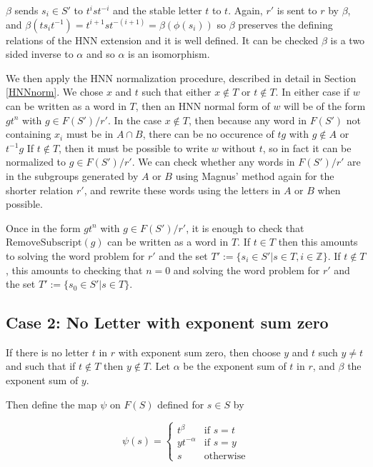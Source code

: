 \documentclass[11pt]{article} %
\theoremstyle{definition}
\theoremstyle{definition}
\theoremstyle{definition}
\theoremstyle{definition}
\theoremstyle{definition}
\theoremstyle{definition}
\begin{document}
$\beta$ sends $s_i \in S'$ to $t^{i} s t^{-i}$ and the stable letter $t$ to $t$.
Again, $r'$ is sent to $r$ by $\beta$, and $\beta (t s_i t^{-1}) = t^{i+1} s t^{-(i+1)} =
\beta (\phi (s_i))$ so $\beta$ preserves the defining relations of the HNN extension and it
is well defined. It can be checked $\beta$ is a two sided inverse to $\alpha$ and so $\alpha$
is an isomorphism.

We then apply the HNN normalization procedure, described in detail in Section \ref{HNNnorm}.
We chose $x$ and $t$ such that either $x \notin T$ or $t \notin T$. In either case if $w$
can be written as a word in $T$, then an HNN normal form of $w$ will be of the form $g t^n$
with $g \in F(S') / r'$. In the case $x \notin T$, then because any word in
$F(S')$ not containing $x_i$ must be in $A \cap B$, there can be no occurence of
$tg$ with $g \notin A$ or $t^{-1}g$
If $t \notin T$, then it must be possible to write $w$ without $t$, so in fact it can be normalized
to $g \in F(S') / r'$. We can check whether any words in $F(S') / r'$ are in the subgroups
generated by $A$ or $B$ using
Magnus' method again for the shorter relation $r'$, and rewrite these words using the letters
in $A$ or $B$ when possible.

Once in the form $g t^n$ with $g \in F(S') / r'$, it is enough to check that
$\text{RemoveSubscript}(g)$ can be written as a word in $T$.
If $t \in T$ then this amounts to solving the word problem for $r'$
and the set $T' := \{ s_i \in S' | s \in T, i \in \mathbb{Z} \}$. If $t \notin T$,
this amounts to checking that $n = 0$ and solving the word problem for
$r'$ and the set $T' := \{s_0 \in S' | s \in T\}$.

\subsection{Case 2: No Letter with exponent sum zero}

If there is no letter $t$ in $r$ with exponent sum zero, then choose $y$
and $t$ such $y \ne t$ and such that if $t \notin T$ then $y \notin T$.
Let $\alpha$ be the exponent sum
of $t$ in $r$, and $\beta$ the exponent sum of $y$.

Then define the map $\psi$ on $F(S)$ defined for $s \in S$ by

\begin{equation}
  \psi(s) =
  \begin{cases}
     t^\beta & \text{if }s = t \\
     yt^{-\alpha} &\text{if } s = y \\
     s & \text{otherwise}
  \end{cases}
\end{equation}
\end{document}

